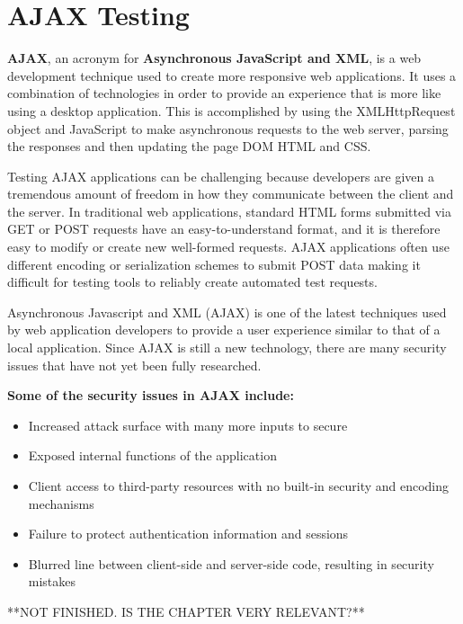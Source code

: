 \chapter{AJAX Testing}

	{\bf AJAX}, an acronym for {\bf Asynchronous JavaScript and XML}, is a web development technique 
	used to create more responsive web applications. It uses a combination of technologies in order 
	to provide an experience that is more like using a desktop application. This is accomplished by 
	using the XMLHttpRequest object and JavaScript to make asynchronous requests to the web server, 
	parsing the responses and then updating the page DOM HTML and CSS.

	Testing AJAX applications can be challenging because developers are given a tremendous amount of 
	freedom in how they communicate between the client and the server. In traditional web 
	applications, standard HTML forms submitted via GET or POST requests have an easy-to-understand 
	format, and it is therefore easy to modify or create new well-formed requests. AJAX applications 
	often use different encoding or serialization schemes to submit POST data making it difficult for 
	testing tools to reliably create automated test requests.

	Asynchronous Javascript and XML (AJAX) is one of the latest techniques used by web application 
	developers to provide a user experience similar to that of a local application. Since AJAX is 
	still a new technology, there are many security issues that have not yet been fully researched.
	 
	{\bf Some of the security issues in AJAX include:}
		\begin{itemize}
			\item Increased attack surface with many more inputs to secure
			\item Exposed internal functions of the application
			\item Client access to third-party resources with no built-in security and encoding mechanisms
			\item Failure to protect authentication information and sessions
			\item Blurred line between client-side and server-side code, resulting in security mistakes
		\end{itemize}


{\color{red} **NOT FINISHED. IS THE CHAPTER VERY RELEVANT?**}

